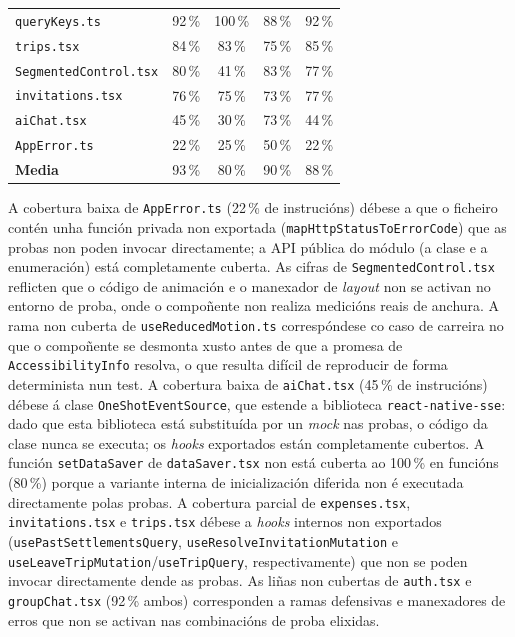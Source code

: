 \begin{table}[H]
\begin{tabularx}{\textwidth}{@{}Xcccc@{}}
    \texttt{queryKeys.ts}             &  92\,\% & 100\,\% &  88\,\% &  92\,\% \\
    \texttt{trips.tsx}                &  84\,\% &  83\,\% &  75\,\% &  85\,\% \\
    \texttt{SegmentedControl.tsx}     &  80\,\% &  41\,\% &  83\,\% &  77\,\% \\
    \texttt{invitations.tsx}          &  76\,\% &  75\,\% &  73\,\% &  77\,\% \\
    \texttt{aiChat.tsx}               &  45\,\% &  30\,\% &  73\,\% &  44\,\% \\
    \texttt{AppError.ts}              &  22\,\% &  25\,\% &  50\,\% &  22\,\% \\
    \midrule
    \textbf{Media}                    &  93\,\% &  80\,\% &  90\,\% &  88\,\% \\
    \bottomrule
  \end{tabularx}
\end{table}

A cobertura baixa de \texttt{AppError.ts} (22\,\% de instrucións) débese a que o ficheiro
contén unha función privada non exportada (\texttt{mapHttpStatusToErrorCode}) que as probas
non poden invocar directamente; a API pública do módulo (a clase e a enumeración) está
completamente cuberta. As cifras de \texttt{SegmentedControl.tsx} reflicten que o código de
animación e o manexador de \textit{layout} non se activan no entorno de proba, onde o
compoñente non realiza medicións reais de anchura. A rama non cuberta de
\texttt{useReducedMotion.ts} correspóndese co caso de carreira no que o compoñente se
desmonta xusto antes de que a promesa de \texttt{AccessibilityInfo} resolva, o que resulta
difícil de reproducir de forma determinista nun test. A cobertura baixa de
\texttt{aiChat.tsx} (45\,\% de instrucións) débese á clase \texttt{OneShotEventSource}, que
estende a biblioteca \texttt{react-native-sse}: dado que esta biblioteca está substituída por
un \textit{mock} nas probas, o código da clase nunca se executa; os \textit{hooks}
exportados están completamente cubertos. A función \texttt{setDataSaver} de
\texttt{dataSaver.tsx} non está cuberta ao 100\,\% en funcións (80\,\%) porque a variante
interna de inicialización diferida non é executada directamente polas probas. A cobertura
parcial de \texttt{expenses.tsx}, \texttt{invitations.tsx} e \texttt{trips.tsx} débese a
\textit{hooks} internos non exportados (\texttt{usePastSettlementsQuery},
\texttt{useResolveInvitationMutation} e \texttt{useLeaveTripMutation}/\texttt{useTripQuery},
respectivamente) que non se poden invocar directamente dende as probas. As liñas non cubertas de \texttt{auth.tsx} e \texttt{groupChat.tsx} (92\,\% ambos)
corresponden a ramas defensivas e manexadores de erros que non se activan nas
combinacións de proba elixidas.

